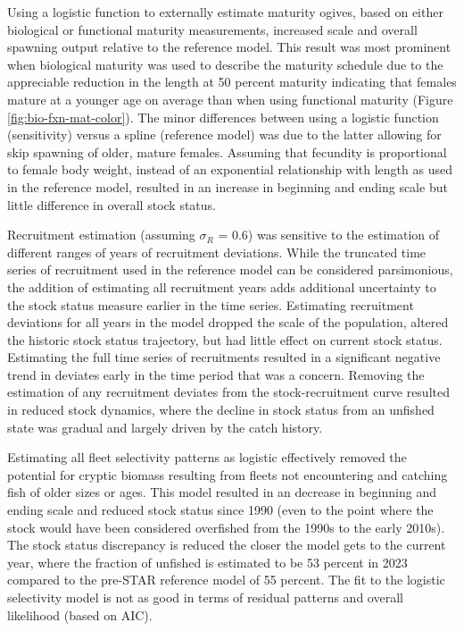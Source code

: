 \documentclass[11pt,
  english,
  letterpaper,
]{article}
\begin{document}
Using a logistic function to externally estimate maturity ogives, based on either biological or functional maturity measurements, increased scale and overall spawning output relative to the reference model. This result was most prominent when biological maturity was used to describe the maturity schedule due to the appreciable reduction in the length at 50 percent maturity indicating that females mature at a younger age on average than when using functional maturity (Figure \ref{fig:bio-fxn-mat-color}). The minor differences between using a logistic function (sensitivity) versus a spline (reference model) was due to the latter allowing for skip spawning of older, mature females. Assuming that fecundity is proportional to female body weight, instead of an exponential relationship with length as used in the reference model, resulted in an increase in beginning and ending scale but little difference in overall stock status.

Recruitment estimation (assuming \(\sigma_R\) = 0.6) was sensitive to the estimation of different ranges of years of recruitment deviations. While the truncated time series of recruitment used in the reference model can be considered parsimonious, the addition of estimating all recruitment years adds additional uncertainty to the stock status measure earlier in the time series. Estimating recruitment deviations for all years in the model dropped the scale of the population, altered the historic stock status trajectory, but had little effect on current stock status. Estimating the full time series of recruitments resulted in a significant negative trend in deviates early in the time period that was a concern. Removing the estimation of any recruitment deviates from the stock-recruitment curve resulted in reduced stock dynamics, where the decline in stock status from an unfished state was gradual and largely driven by the catch history.

Estimating all fleet selectivity patterns as logistic effectively removed the potential for cryptic biomass resulting from fleets not encountering and catching fish of older sizes or ages. This model resulted in an decrease in beginning and ending scale and reduced stock status since 1990 (even to the point where the stock would have been considered overfished from the 1990s to the early 2010s). The stock status discrepancy is reduced the closer the model gets to the current year, where the fraction of unfished is estimated to be 53 percent in 2023 compared to the pre-STAR reference model of 55 percent. The fit to the logistic selectivity model is not as good in terms of residual patterns and overall likelihood (based on AIC).
\end{document}
